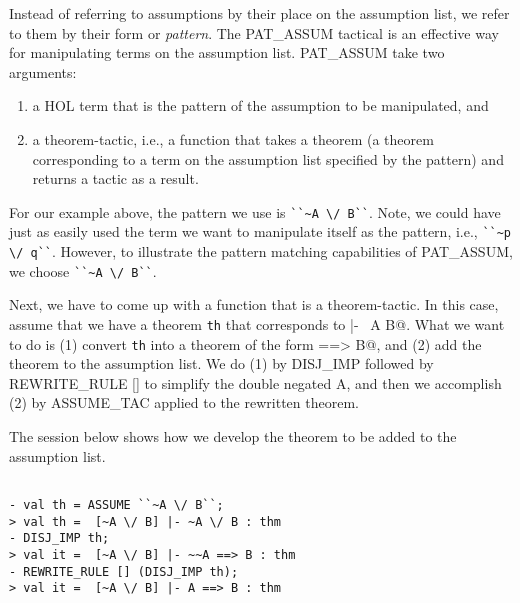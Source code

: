 Instead of referring to assumptions by their place on the assumption
list, we refer to them by their form or \emph{pattern}. The PAT\_ASSUM
tactical is an effective way for manipulating terms on the assumption
list.  PAT\_ASSUM take two arguments:
\begin{enumerate}
\item a HOL term that is the pattern of the assumption to be
  manipulated, and
\item a theorem-tactic, i.e., a function that takes a theorem (a
  theorem corresponding to a term on the assumption list specified by
  the pattern) and returns a tactic as a result.
\end{enumerate}

For our example above, the pattern we use is \verb|``~A \/ B``|.
Note, we could have just as easily used the term we want to manipulate
itself as the pattern, i.e., \verb|``~p \/ q``|. However, to
illustrate the pattern matching capabilities of PAT\_ASSUM, we choose
\verb|``~A \/ B``|.

Next, we have to come up with a function that is a theorem-tactic. In
this case, assume that we have a theorem \verb|th| that corresponds to
\verb@[.] |- ~A \/ B@. What we want to do is (1) convert \texttt{th}
into a theorem of the form \verb@A ==> B@, and (2) add the theorem to
the assumption list.  We do (1) by DISJ\_IMP followed by REWRITE\_RULE
[] to simplify the double negated A, and then we accomplish (2) by
ASSUME_TAC applied to the rewritten theorem.

The session below shows how we develop the theorem to be added to the
assumption list.
\begin{session}
  \begin{scriptsize}
\begin{verbatim}

- val th = ASSUME ``~A \/ B``;
> val th =  [~A \/ B] |- ~A \/ B : thm
- DISJ_IMP th;
> val it =  [~A \/ B] |- ~~A ==> B : thm
- REWRITE_RULE [] (DISJ_IMP th);
> val it =  [~A \/ B] |- A ==> B : thm
\end{verbatim}
  \end{scriptsize}
\end{session}

